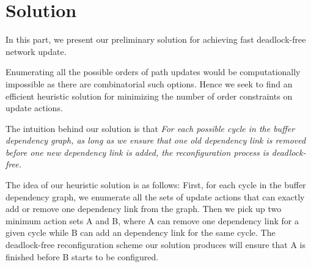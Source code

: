 \section{Solution}\label{sec:solution}

In this part, we present our preliminary solution for achieving fast deadlock-free network update.

Enumerating all the possible orders of path updates would be computationally impossible as there are combinatorial such options.  Hence we seek to find an efficient heuristic solution for minimizing the number of order constraints on update actions.

The intuition behind our solution is that \textit{For each possible cycle in the buffer dependency graph, as long as we ensure that one old dependency link is removed before one new dependency link is added, the reconfiguration process is deadlock-free.} 

The idea of our heuristic solution is as follows: First, for each cycle in the buffer dependency graph, we enumerate all the sets of update actions that can exactly add or remove one dependency link from the graph. Then we pick up two minimum action sets A and B, where A can remove one dependency link for a given cycle while B can add an dependency link for the same cycle. The deadlock-free reconfiguration scheme our solution produces will ensure that A is finished before B starts to be configured.

